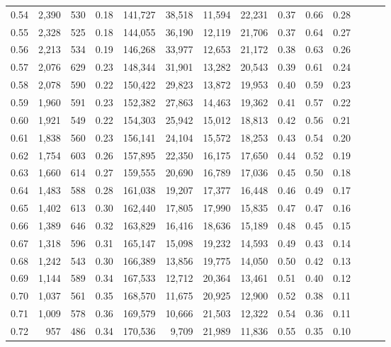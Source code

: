 \begin{tabular}{rrrrrrrrrrrrrr}
0.54 &  2,390 &  530 &  0.18 &  141,727 &   38,518 &  11,594 &  22,231 &  0.37 &  0.66 &      0.28 \\
0.55 &  2,328 &  525 &  0.18 &  144,055 &   36,190 &  12,119 &  21,706 &  0.37 &  0.64 &      0.27 \\
0.56 &  2,213 &  534 &  0.19 &  146,268 &   33,977 &  12,653 &  21,172 &  0.38 &  0.63 &      0.26 \\
0.57 &  2,076 &  629 &  0.23 &  148,344 &   31,901 &  13,282 &  20,543 &  0.39 &  0.61 &      0.24 \\
0.58 &  2,078 &  590 &  0.22 &  150,422 &   29,823 &  13,872 &  19,953 &  0.40 &  0.59 &      0.23 \\
0.59 &  1,960 &  591 &  0.23 &  152,382 &   27,863 &  14,463 &  19,362 &  0.41 &  0.57 &      0.22 \\
0.60 &  1,921 &  549 &  0.22 &  154,303 &   25,942 &  15,012 &  18,813 &  0.42 &  0.56 &      0.21 \\
0.61 &  1,838 &  560 &  0.23 &  156,141 &   24,104 &  15,572 &  18,253 &  0.43 &  0.54 &      0.20 \\
0.62 &  1,754 &  603 &  0.26 &  157,895 &   22,350 &  16,175 &  17,650 &  0.44 &  0.52 &      0.19 \\
0.63 &  1,660 &  614 &  0.27 &  159,555 &   20,690 &  16,789 &  17,036 &  0.45 &  0.50 &      0.18 \\
0.64 &  1,483 &  588 &  0.28 &  161,038 &   19,207 &  17,377 &  16,448 &  0.46 &  0.49 &      0.17 \\
0.65 &  1,402 &  613 &  0.30 &  162,440 &   17,805 &  17,990 &  15,835 &  0.47 &  0.47 &      0.16 \\
0.66 &  1,389 &  646 &  0.32 &  163,829 &   16,416 &  18,636 &  15,189 &  0.48 &  0.45 &      0.15 \\
0.67 &  1,318 &  596 &  0.31 &  165,147 &   15,098 &  19,232 &  14,593 &  0.49 &  0.43 &      0.14 \\
0.68 &  1,242 &  543 &  0.30 &  166,389 &   13,856 &  19,775 &  14,050 &  0.50 &  0.42 &      0.13 \\
0.69 &  1,144 &  589 &  0.34 &  167,533 &   12,712 &  20,364 &  13,461 &  0.51 &  0.40 &      0.12 \\
0.70 &  1,037 &  561 &  0.35 &  168,570 &   11,675 &  20,925 &  12,900 &  0.52 &  0.38 &      0.11 \\
0.71 &  1,009 &  578 &  0.36 &  169,579 &   10,666 &  21,503 &  12,322 &  0.54 &  0.36 &      0.11 \\
0.72 &    957 &  486 &  0.34 &  170,536 &    9,709 &  21,989 &  11,836 &  0.55 &  0.35 &      0.10 \\

\end{tabular}
